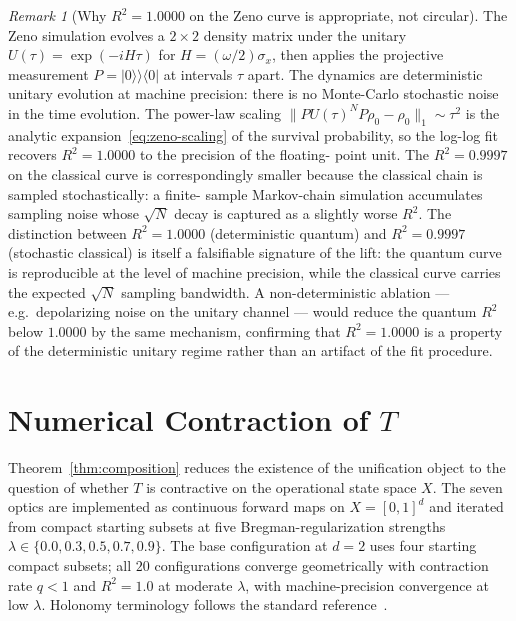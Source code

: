 \documentclass[11pt,a4paper]{article}
\theoremstyle{plain}
\theoremstyle{definition}
\theoremstyle{remark}
\newtheorem{remark}[theorem]{Remark}
\begin{document}
\begin{remark}[Why $R^2 = 1.0000$ on the Zeno curve is appropriate,
not circular]
\label{rem:zeno-r2}
The Zeno simulation evolves a $2{\times}2$ density matrix under the
unitary $U(\tau) = \exp(-i H\tau)$ for $H = (\omega/2)\sigma_x$, then
applies the projective measurement $P = |0\rangle\!\rangle\langle\!0|$
at intervals $\tau$ apart. The dynamics are deterministic unitary
evolution at machine precision: there is no Monte-Carlo stochastic
noise in the time evolution. The power-law scaling
$\|P U(\tau)^N P \rho_0 - \rho_0\|_1 \sim \tau^2$ is the analytic
expansion~\eqref{eq:zeno-scaling} of the survival probability, so the
log-log fit recovers $R^2 = 1.0000$ to the precision of the floating-
point unit. The $R^2 = 0.9997$ on the classical curve is correspondingly
smaller because the classical chain is sampled stochastically: a finite-
sample Markov-chain simulation accumulates sampling noise whose
$\sqrt{N}$ decay is captured as a slightly worse $R^2$. The distinction
between $R^2 = 1.0000$ (deterministic quantum) and $R^2 = 0.9997$
(stochastic classical) is itself a falsifiable signature of the lift:
the quantum curve is reproducible at the level of machine precision,
while the classical curve carries the expected $\sqrt{N}$ sampling
bandwidth. A non-deterministic ablation --- e.g.\ depolarizing noise
on the unitary channel --- would reduce the quantum $R^2$ below
$1.0000$ by the same mechanism, confirming that $R^2 = 1.0000$ is a
property of the deterministic unitary regime rather than an artifact
of the fit procedure.
\end{remark}

\section{Numerical Contraction of $T$}\label{sec:titer}

Theorem~\ref{thm:composition} reduces the existence of the unification
object to the question of whether $T$ is contractive on the operational
state space $X$. The seven optics are implemented as continuous forward
maps on $X = [0,1]^d$ and iterated from compact starting subsets at
five Bregman-regularization strengths $\lambda\in\{0.0, 0.3, 0.5, 0.7,
0.9\}$. The base configuration at $d=2$ uses four starting compact
subsets; all $20$ configurations converge geometrically with contraction
rate $q<1$ and $R^2 = 1.0$ at moderate $\lambda$, with machine-precision
convergence at low $\lambda$. Holonomy terminology follows the standard
reference~\cite{misner1973}.
\end{document}
